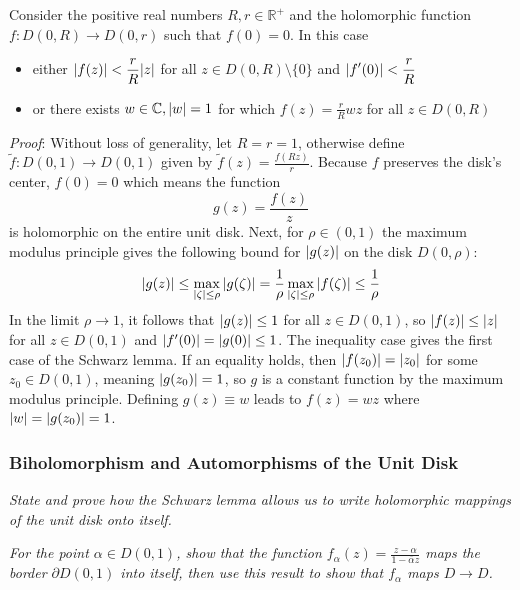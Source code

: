 \documentclass[11pt, a4paper]{article}
\newcommand{\question}[1]{\textit{#1}\vspace{2mm}}
\newcommand{\R}{\mathbb{R}} %
\newcommand{\C}{\mathbb{C}} %
\begin{document}
Consider the positive real numbers $ R, r \in \R^+ $ and the holomorphic function $ f : D(0, R) \to D(0, r) $ such that $ f(0) = 0 $. In this case
\begin{itemize}
	\item either $ \displaystyle{\abs{f(z)} < \frac{r}{R}\abs{z}} $ for all $ z \in D(0, R) \setminus \{0 \} $ and $ \displaystyle{\abs{f'(0)} < \frac{r}{R}} $
	
	\item or there exists $ w \in \C, \abs{w} = 1 $ for which $ \displaystyle{f(z) = \frac{r}{R} w z } $ for all $ z \in D(0, R) $
\end{itemize}
\textit{Proof}: Without loss of generality, let $ R = r = 1 $, otherwise define $ \tilde{f}:D(0,1)\to D(0,1) $ given by $ \tilde{f}(z) = \frac{f(Rz)}{r} $. Because $ f $ preserves the disk's center, $ f(0) = 0 $ which means the function 
\begin{equation*}
	g(z) = \frac{f(z)}{z}
\end{equation*}
is holomorphic on the entire unit disk. Next, for $ \rho \in (0, 1) $ the maximum modulus principle gives the following bound for $ \abs{g(z)} $ on the disk $ D(0, \rho) $:
\begin{equation*}
	\abs{g(z)} \leq \max_{\abs{\zeta} \leq \rho}\abs{g(\zeta)} = \frac{1}{\rho}\max_{\abs{\zeta} \leq \rho}\abs{f(\zeta)} \leq \frac{1}{\rho}
\end{equation*}
In the limit $ \rho \to 1 $, it follows that $ \abs{g(z)} \leq 1 $ for all $ z \in D(0,1) $, so $ \abs{f(z)} \leq \abs{z} $ for all $ z \in D(0,1) $ and $ \abs{f'(0)} = \abs{g(0)} \leq 1$. The inequality case gives the first case of the Schwarz lemma. If an equality holds, then $ \abs{f(z_{0})} = \abs{z_{0}} $ for some $ z_{0} \in D(0,1)$, meaning $ \abs{g(z_{0})} = 1 $, so $ g $ is a constant function by the maximum modulus principle. Defining $ g(z) \equiv w $ leads to $ f(z) = wz $ where $ \abs{w} = \abs{g(z_{0})} = 1 $.



\subsubsection{Biholomorphism and Automorphisms of the Unit Disk}
\question{State and  prove how the Schwarz lemma allows us to write holomorphic mappings of the unit disk onto itself.}

\question{For the point $ \alpha \in D(0, 1) $, show that the function $ f_{\alpha}(z) = \frac{z - \alpha}{1 - \overline{\alpha}z} $ maps the border $ \partial D(0, 1) $ into itself, then use this result to show that $ f_{\alpha} $ maps $ D \to D $.}
\end{document}
